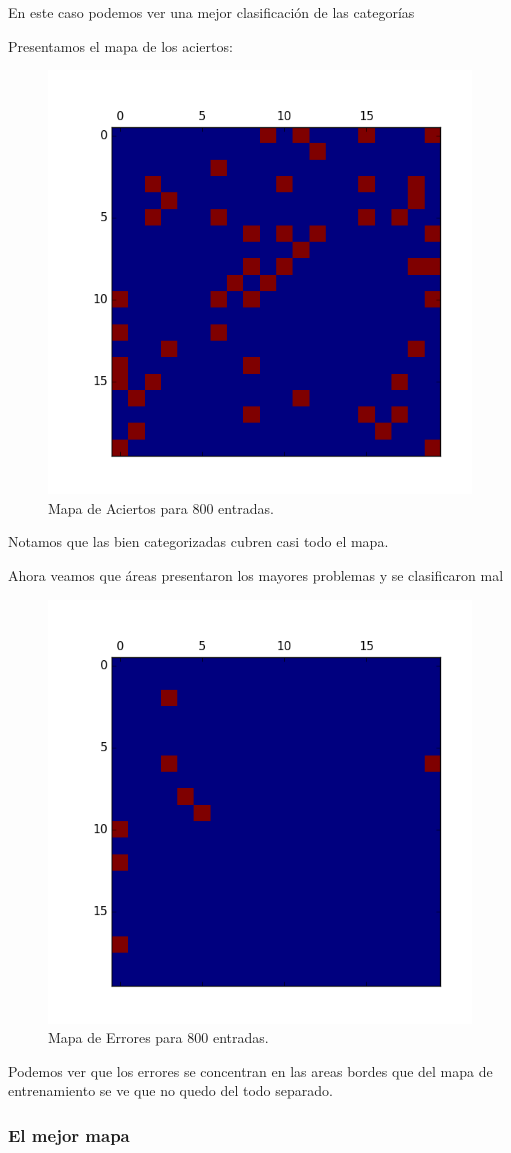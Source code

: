 En este caso podemos ver una mejor clasificación de las categorías

Presentamos el mapa de los aciertos:

\begin{figure}[H]
  \centering
  \includegraphics[width=0.5\columnwidth]{secciones/graficos/kohonen/mapaaciertos800.png}
  \caption{Mapa de Aciertos para 800 entradas.}
  \label{fig:mapa aciertos 800}
\end{figure}

Notamos que las bien categorizadas cubren casi todo el mapa.

Ahora veamos que áreas presentaron los mayores problemas y se clasificaron mal

\begin{figure}[H]
  \centering
  \includegraphics[width=0.5\columnwidth]{secciones/graficos/kohonen/mapaerrores800.png}
  \caption{Mapa de Errores para 800 entradas.}
  \label{fig:mapa errores 800}
\end{figure}

Podemos ver que los errores se concentran en las areas bordes que del mapa
de entrenamiento se ve que no quedo del todo separado.


\subsubsection{El mejor mapa}

